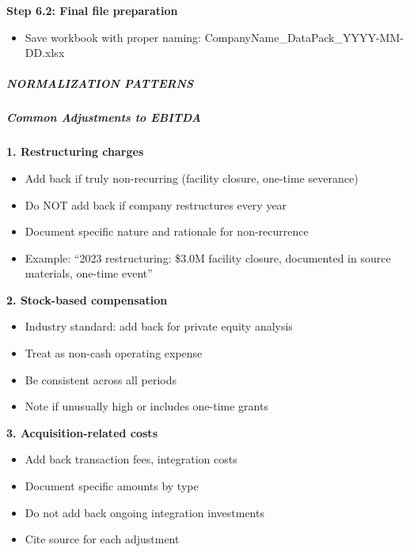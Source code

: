 \documentclass[11pt]{article}
\begin{document}
\textbf{Step 6.2: Final file preparation}

\begin{itemize}[leftmargin=*,itemsep=2pt,topsep=2pt]
\item {} Save workbook with proper naming: CompanyName\_\allowbreak{}DataPack\_\allowbreak{}YYYY-MM-DD.xlsx
\end{itemize}

\subparagraph{NORMALIZATION PATTERNS}\mbox{}\par

\subparagraph{Common Adjustments to EBITDA}\mbox{}\par

\textbf{1. Restructuring charges}

\begin{itemize}[leftmargin=*,itemsep=2pt,topsep=2pt]
\item {} Add back if truly non-recurring (facility closure, one-time severance)
\item {} Do NOT add back if company restructures every year
\item {} Document specific nature and rationale for non-recurrence
\item {} Example: ``2023 restructuring: \$3.0M facility closure, documented in source materials, one-time event''
\end{itemize}

\textbf{2. Stock-based compensation}

\begin{itemize}[leftmargin=*,itemsep=2pt,topsep=2pt]
\item {} Industry standard: add back for private equity analysis
\item {} Treat as non-cash operating expense
\item {} Be consistent across all periods
\item {} Note if unusually high or includes one-time grants
\end{itemize}

\textbf{3. Acquisition-related costs}

\begin{itemize}[leftmargin=*,itemsep=2pt,topsep=2pt]
\item {} Add back transaction fees, integration costs
\item {} Document specific amounts by type
\item {} Do not add back ongoing integration investments
\item {} Cite source for each adjustment
\end{itemize}
\end{document}
